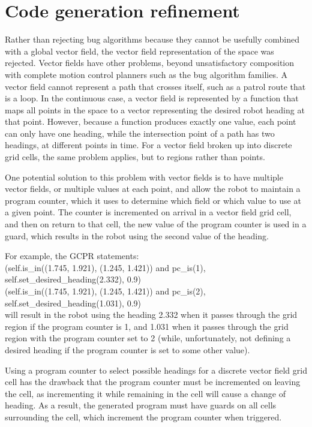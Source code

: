 \section{Code generation refinement}

Rather than rejecting bug algorithms because they cannot be usefully combined with a global vector field, the vector field representation of the space was rejected. 
Vector fields have other problems, beyond unsatisfactory composition with complete motion control planners such as the bug algorithm families. 
A vector field cannot represent a path that crosses itself, such as a patrol route that is a loop.
In the continuous case, a vector field is represented by a function that maps all points in the space to a vector representing the desired robot heading at that point. 
However, because a function produces exactly one value, each point can only have one heading, while the intersection point of a path has two headings, at different points in time. 
For a vector field broken up into discrete grid cells, the same problem applies, but to regions rather than points. 

One potential solution to this problem with vector fields is to have multiple vector fields, or multiple values at each point, and allow the robot to maintain a program counter, which it uses to determine which field or which value to use at a given point. 
The counter is incremented on arrival in a vector field grid cell, and then on return to that cell, the new value of the program counter is used in a guard, which results in the robot using the second value of the heading. 

For example, the GCPR statements:\\
(self.is\_in((1.745, 1.921), (1.245, 1.421)) and pc\_is(1), self.set\_desired\_heading(2.332), 0.9)\\
(self.is\_in((1.745, 1.921), (1.245, 1.421)) and pc\_is(2), self.set\_desired\_heading(1.031), 0.9)\\
will result in the robot using the heading 2.332 when it passes through the grid region if the program counter is 1, and 1.031 when it passes through the grid region with the program counter set to 2 (while, unfortunately, not defining a desired heading if the program counter is set to some other value).

Using a program counter to select possible headings for a discrete vector field grid cell has the drawback that the program counter must be incremented on leaving the cell, as incrementing it while remaining in the cell will cause a change of heading.
As a result, the generated program must have guards on all cells surrounding the cell, which increment the program counter when triggered. 


